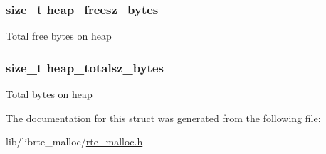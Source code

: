 \subsubsection[{heap\+\_\+freesz\+\_\+bytes}]{\setlength{\rightskip}{0pt plus 5cm}size\+\_\+t heap\+\_\+freesz\+\_\+bytes}\label{structrte__malloc__socket__stats_af21563aaa4e77ce700303f35a677fcd6}
Total free bytes on heap \hypertarget{structrte__malloc__socket__stats_ad7e076b5351846ea603a6618b5636bcf}{}
\subsubsection[{heap\+\_\+totalsz\+\_\+bytes}]{\setlength{\rightskip}{0pt plus 5cm}size\+\_\+t heap\+\_\+totalsz\+\_\+bytes}\label{structrte__malloc__socket__stats_ad7e076b5351846ea603a6618b5636bcf}
Total bytes on heap 

The documentation for this struct was generated from the following file\+:\begin{DoxyCompactItemize}
\item 
lib/librte\+\_\+malloc/\hyperlink{rte__malloc_8h}{rte\+\_\+malloc.\+h}\end{DoxyCompactItemize}
